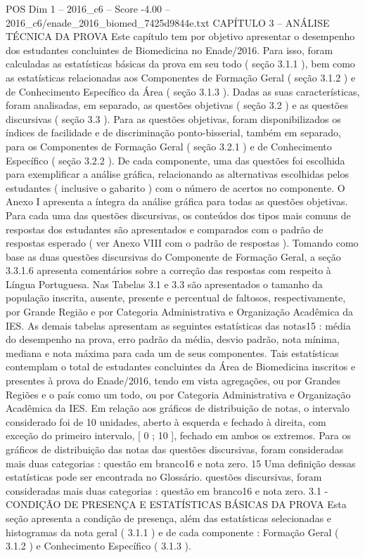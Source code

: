 \begin{textsample}{POS Dim 1 – 2016\_c6 – Score -4.00 – 2016\_c6/enade\_2016\_biomed\_7425d9844e.txt}  \label{ex:f1_pos_397}
CAPÍTULO 3 – ANÁLISE TÉCNICA DA PROVA Este capítulo tem por objetivo apresentar o desempenho dos estudantes concluintes de Biomedicina no Enade/2016.
Para isso, foram calculadas as estatísticas básicas da prova em seu todo ( seção 3.1.1 ), bem como as estatísticas relacionadas aos Componentes de Formação Geral ( seção 3.1.2 ) e de Conhecimento Específico da Área ( seção 3.1.3 ).
Dadas as suas características, foram analisadas, em separado, as questões objetivas ( seção 3.2 ) e as questões discursivas ( seção 3.3 ).
Para as questões objetivas, foram disponibilizados os índices de facilidade e de discriminação ponto-bisserial, também em separado, para os Componentes de Formação Geral ( seção 3.2.1 ) e de Conhecimento Específico ( seção 3.2.2 ).
De cada componente, uma das questões foi escolhida para exemplificar a análise gráfica, relacionando as alternativas escolhidas pelos estudantes ( inclusive o gabarito ) com o número de acertos no componente.
O Anexo I apresenta a íntegra da análise gráfica para todas as questões objetivas.
Para cada uma das questões discursivas, os conteúdos dos tipos mais comuns de respostas dos estudantes são apresentados e comparados com o padrão de respostas esperado ( ver Anexo VIII com o padrão de respostas ).
Tomando como base as duas questões discursivas do Componente de Formação Geral, a seção 3.3.1.6 apresenta comentários sobre a correção das respostas com respeito à Língua Portuguesa.
Nas Tabelas 3.1 e 3.3 são apresentados o tamanho da população inscrita, ausente, presente e percentual de faltosos, respectivamente, por Grande Região e por Categoria Administrativa e Organização Acadêmica da IES.
As demais tabelas apresentam as seguintes estatísticas das notas15 : média do desempenho na prova, erro padrão da média, desvio padrão, nota mínima, mediana e nota máxima para cada um de seus componentes.
Tais estatísticas contemplam o total de estudantes concluintes da Área de Biomedicina inscritos e presentes à prova do Enade/2016, tendo em vista agregações, ou por Grandes Regiões e o país como um todo, ou por Categoria Administrativa e Organização Acadêmica da IES.
Em relação aos gráficos de distribuição de notas, o intervalo considerado foi de 10 unidades, aberto à esquerda e fechado à direita, com exceção do primeiro intervalo, [ 0 ; 10 ], fechado em ambos os extremos.
Para os gráficos de distribuição das notas das questões discursivas, foram consideradas mais duas categorias : questão em branco16 e nota zero. 15 Uma definição dessas estatísticas pode ser encontrada no Glossário. questões discursivas, foram consideradas mais duas categorias : questão em branco16 e nota zero. 3.1 - CONDIÇÃO DE PRESENÇA E ESTATÍSTICAS BÁSICAS DA PROVA Esta seção apresenta a condição de presença, além das estatísticas selecionadas e histogramas da nota geral ( 3.1.1 ) e de cada componente : Formação Geral ( 3.1.2 ) e Conhecimento Específico ( 3.1.3 ).

\end{textsample}
